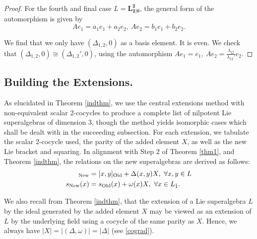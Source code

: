 \documentclass[12pt]{amsart}
\begin{document}
\begin{proof}
\vspace{0.5 em}

For the fourth and final case $L=\mathbf{L^2_{2|0}}$, the general form of the automorphism is given by
\begin{equation*}
Ae_1=a_1e_1+a_2e_2, ~Ae_2=b_1e_1+b_2e_2.
\end{equation*}

We find that we only have $(\Delta_{1,2},0)$ as a basis element. It is even. We check that $(\Delta_{1,2},0) \cong (\Delta_{1,2}',0)$, using the automorphism $Ae_1=e_1, ~Ae_2=\frac{\lambda_{12}}{\lambda_{12}'}e_2$.
\end{proof}

\subsection{Building the Extensions.}\label{4.3} As elucidated in Theorem \ref{indthm}, we use the central extensions method with non-equivalent scalar 2-cocycles to produce a complete list of nilpotent Lie superalgebras of dimension 3, though the method yields isomorphic cases which shall be dealt with in the succeeding subsection. For each extension, we tabulate the scalar 2-cocycle used, the parity of the added element $X$, as well as the new Lie bracket and squaring. In alignment with Step 2 of Theorem \ref{thm1}, and Theorem \ref{indthm}, the relations on the new superalgebras are derived as follows:
\begin{align}
  [x,y]_{\mathrm{New}}&=[x,y]_{\mathrm{Old}}+
  \Delta(x,y) X, ~\forall x,y\in L\\
  s_{\mathrm{New}}(x)&=s_{\mathrm{Old}}(x)+\omega(x)X, ~\forall x\in L_{\od} .
\end{align}

We also recall from Theorem \ref{indthm}, that the extension of a Lie superalgebra $L$ by the ideal generated by the added element $X$ may be viewed as an extension of $L$ by the underlying field using a cocycle of the same parity as $X$. Hence, we always have $|X|=|(\Delta,\omega)|=|\Delta|$ (see \eqref{cograd}).

\vspace{0.5 em}
\end{document}
